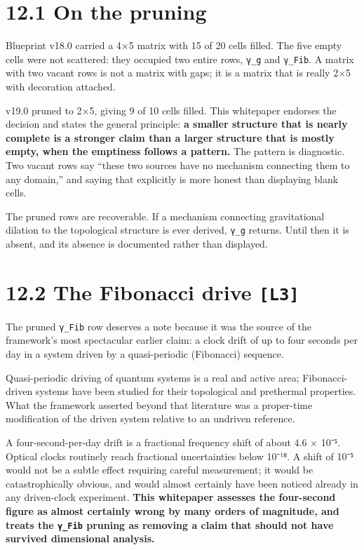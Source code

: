 \documentclass[
  11pt]{report}
\begin{document}
\hypertarget{on-the-pruning}{%
\section{12.1 On the pruning}\label{on-the-pruning}}

Blueprint v18.0 carried a 4×5 matrix with 15 of 20 cells filled. The
five empty cells were not scattered: they occupied two entire rows,
\texttt{γ\_g} and \texttt{γ\_Fib}. A matrix with two vacant rows is not
a matrix with gaps; it is a matrix that is really 2×5 with decoration
attached.

v19.0 pruned to 2×5, giving 9 of 10 cells filled. This whitepaper
endorses the decision and states the general principle: \textbf{a
smaller structure that is nearly complete is a stronger claim than a
larger structure that is mostly empty, when the emptiness follows a
pattern.} The pattern is diagnostic. Two vacant rows say ``these two
sources have no mechanism connecting them to any domain,'' and saying
that explicitly is more honest than displaying blank cells.

The pruned rows are recoverable. If a mechanism connecting gravitational
dilation to the topological structure is ever derived, \texttt{γ\_g}
returns. Until then it is absent, and its absence is documented rather
than displayed.

\hypertarget{the-fibonacci-drive-l3}{%
\section{\texorpdfstring{12.2 The Fibonacci drive
\texttt{{[}L3{]}}}{12.2 The Fibonacci drive {[}L3{]}}}\label{the-fibonacci-drive-l3}}

The pruned \texttt{γ\_Fib} row deserves a note because it was the source
of the framework's most spectacular earlier claim: a clock drift of up
to four seconds per day in a system driven by a quasi-periodic
(Fibonacci) sequence.

Quasi-periodic driving of quantum systems is a real and active area;
Fibonacci-driven systems have been studied for their topological and
prethermal properties. What the framework asserted beyond that
literature was a proper-time modification of the driven system relative
to an undriven reference.

A four-second-per-day drift is a fractional frequency shift of about 4.6
× 10⁻⁵. Optical clocks routinely reach fractional uncertainties below
10⁻¹⁸. A shift of 10⁻⁵ would not be a subtle effect requiring careful
measurement; it would be catastrophically obvious, and would almost
certainly have been noticed already in any driven-clock experiment.
\textbf{This whitepaper assesses the four-second figure as almost
certainly wrong by many orders of magnitude, and treats the
\texttt{γ\_Fib} pruning as removing a claim that should not have
survived dimensional analysis.}
\end{document}
